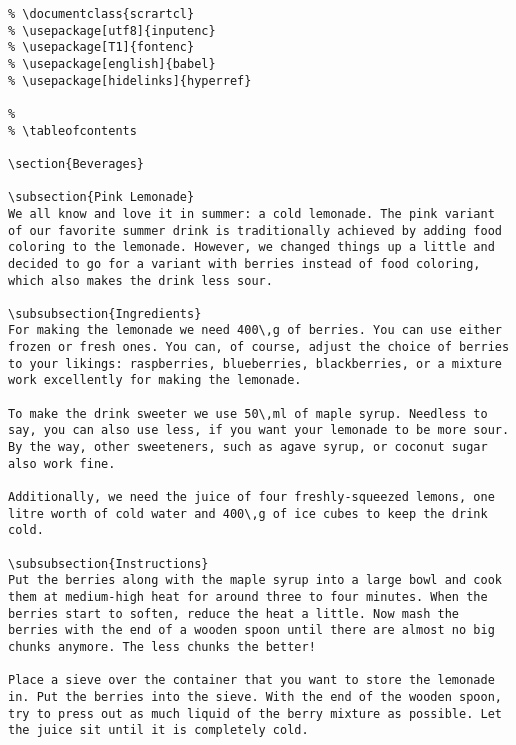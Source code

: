 \begin{verbatim}
% \documentclass{scrartcl}
% \usepackage[utf8]{inputenc}
% \usepackage[T1]{fontenc}
% \usepackage[english]{babel}
% \usepackage[hidelinks]{hyperref}
	
% 
% \tableofcontents
	
\section{Beverages}
	
\subsection{Pink Lemonade}
We all know and love it in summer: a cold lemonade. The pink variant of our favorite summer drink is traditionally achieved by adding food coloring to the lemonade. However, we changed things up a little and decided to go for a variant with berries instead of food coloring, which also makes the drink less sour.
	
\subsubsection{Ingredients}
For making the lemonade we need 400\,g of berries. You can use either frozen or fresh ones. You can, of course, adjust the choice of berries to your likings: raspberries, blueberries, blackberries, or a mixture work excellently for making the lemonade.

To make the drink sweeter we use 50\,ml of maple syrup. Needless to say, you can also use less, if you want your lemonade to be more sour. By the way, other sweeteners, such as agave syrup, or coconut sugar also work fine.

Additionally, we need the juice of four freshly-squeezed lemons, one litre worth of cold water and 400\,g of ice cubes to keep the drink cold.
	
\subsubsection{Instructions}
Put the berries along with the maple syrup into a large bowl and cook them at medium-high heat for around three to four minutes. When the berries start to soften, reduce the heat a little. Now mash the berries with the end of a wooden spoon until there are almost no big chunks anymore. The less chunks the better!
	
Place a sieve over the container that you want to store the lemonade in. Put the berries into the sieve. With the end of the wooden spoon, try to press out as much liquid of the berry mixture as possible. Let the juice sit until it is completely cold.
	

\end{verbatim}
